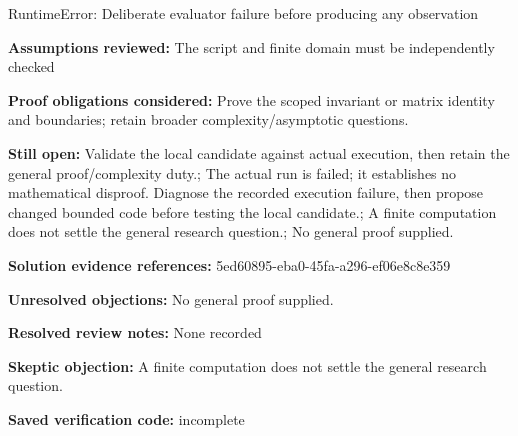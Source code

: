 \documentclass[11pt]{article}
\begin{document}
RuntimeError: Deliberate evaluator failure before producing any observation\par
\textbf{Assumptions reviewed:} The script and finite domain must be independently checked\par
\textbf{Proof obligations considered:} Prove the scoped invariant or matrix identity and boundaries; retain broader complexity/asymptotic questions.\par
\textbf{Still open:} Validate the local candidate against actual execution, then retain the general proof/complexity duty.; The actual run is failed; it establishes no mathematical disproof. Diagnose the recorded execution failure, then propose changed bounded code before testing the local candidate.; A finite computation does not settle the general research question.; No general proof supplied.\par
\textbf{Solution evidence references:} 5ed60895-eba0-45fa-a296-ef06e8c8e359\par
\textbf{Unresolved objections:} No general proof supplied.\par
\textbf{Resolved review notes:} None recorded\par
\textbf{Skeptic objection:} A finite computation does not settle the general research question.\par
\textbf{Saved verification code:} incomplete\par
\end{document}
